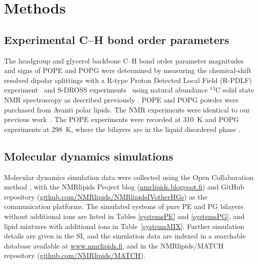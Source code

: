 \documentclass[aps,prl,superscriptaddress,twocolumn]{revtex4}
\begin{document}



\section{Methods}
\subsection{Experimental C--H bond order parameters}
The headgroup and glycerol backbone C--H bond order parameter magnitudes and signs of POPE and POPG
were determined by measuring the chemical-shift resolved dipolar splittings
with a R-type Proton Detected Local Field (R-PDLF) experiment~\cite{dvinskikh04} and
S-DROSS experiments~\cite{gross97} using natural abundance $^{13}$C solid state NMR spectroscopy
as described previously \cite{ferreira13,ferreira16}.
POPE and POPG powder were purchased from Avanti polar lipids.
The NMR experiments were identical to our previous work~\cite{antila19}.
The POPE experiments were recorded at 310~K and POPG experiments at 298~K, where the bilayers are in the liquid disordered phase \cite{marsh13}.


\subsection{Molecular dynamics simulations}

Molecular dynamics simulation data were collected using
the Open Collaboration method \cite{botan15}, with
the NMR\-lipids Project blog (\url{nmrlipids.blogspot.fi}) and
GitHub repository (\url{github.com/NMRlipids/NMRlipidsIVotherHGs})
as the communication platforms.
The simulated systems of pure PE and PG bilayers without additional ions
are listed in Tables \ref{systemsPE} and \ref{systemsPG},
and lipid mixtures with additional ions in Table~\ref{systemsMIX}.
Further simulation details are given in the SI, and
the simulation data are indexed in a
searchable database available at \url{www.nmrlipids.fi},
and in the NMRlipids/MATCH repository (\url{github.com/NMRlipids/MATCH}).
\end{document}
